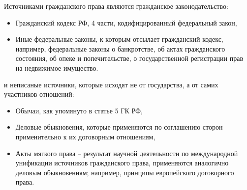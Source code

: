 \documentclass[a4paper, 12pt]{article}
\begin{document}
Источниками гражданского права являются гражданское законодательство:
\begin{itemize}
\item Гражданский кодекс РФ, 4 части, кодифицированный федеральный закон, 
\item Иные федеральные законы, к которым отсылает гражданский кодекс, например, федеральные законы о банкротстве, об актах гражданского состояния, об опеке и попечительстве, о государственной регистрации прав на недвижимое имущество. 
\end{itemize}
и неписаные источники, которые исходят не от государства, а от самих участников отношений:
\begin{itemize}
\item Обычаи, как упомянуто в статье 5 ГК РФ,
\item Деловые обыкновения, которые применяются по соглашению сторон применительно к их договорным отношениям,
\item Акты мягкого права -- результат научной деятельности по международной унификации источников гражданского права, применяются аналогично деловым обыкновениям; например, принципы европейского договорного права. 
\end{itemize}
\end{document}

